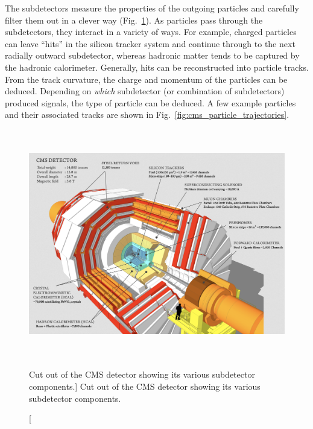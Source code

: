 The subdetectors measure the properties of the outgoing particles and carefully filter them out in a clever way (Fig.~\ref{fig:cms_cut_out_view}).
As particles pass through the subdetectors, they interact in a variety of ways.
For example, charged particles can leave ``hits'' in the silicon tracker system and continue through to the next radially outward subdetector, whereas hadronic matter tends to be captured by the hadronic calorimeter.
Generally, hits can be reconstructed into particle tracks.
From the track curvature, the charge and momentum of the particles can be deduced.
Depending on \emph{which} subdetector (or combination of subdetectors) produced signals, the type of particle can be deduced.
A few example particles and their associated tracks are shown in Fig.~\ref{fig:cms_particle_trajectories}.
\begin{figure}[bth]
\centering
\includegraphics[height=10cm,keepaspectratio]{figures/cms/cms_cut_away.png}
    \caption
        [Cut out of the CMS detector showing its various subdetector components.]
        {Cut out of the CMS detector showing its various subdetector components.}
    \label{fig:cms_cut_out_view}
\end{figure}

